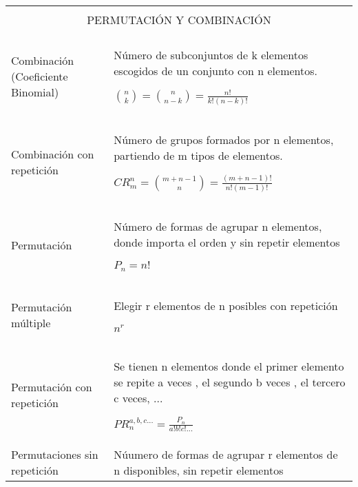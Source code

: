 \begin{center}
\begin{longtable}{|p{3cm}|p{9cm}|}
\hline
\multicolumn{2}{|c|}{} \\
\multicolumn{2}{|c|}{PERMUTACIÓN Y COMBINACIÓN} \\
\multicolumn{2}{|c|}{} \\ \hline
Combinación (Coeficiente Binomial) & Número de subconjuntos de k elementos escogidos de un conjunto con n elementos.

$ \binom{n}{k} = \binom{n}{n-k} = \frac{n!}{k!(n-k)!} $ \\ \hline
Combinación con repetición & Número de grupos formados por n elementos, partiendo de m tipos de elementos.

$ CR_{m}^{n} = \binom{m+n-1}{n} = \frac{(m + n - 1)!}{n!(m-1)!} $
\\ \hline
Permutación & Número de formas de agrupar n elementos, donde importa el orden y sin repetir elementos

$ P_{n} = n! $
\\ \hline
Permutación múltiple & 
Elegir r elementos de n posibles con repetición 


$ n^{r} $
\\ \hline
Permutación con repetición & Se tienen n elementos donde el primer elemento se repite a veces , el segundo b veces , el tercero c veces, ...

$ PR_{n}^{a,b,c...} = \frac{P_{n}}{a!b!c!...}$
\\ \hline
Permutaciones sin repetición & Núumero de formas de agrupar r elementos de n disponibles, sin repetir elementos



\end{longtable}
\end{center}
